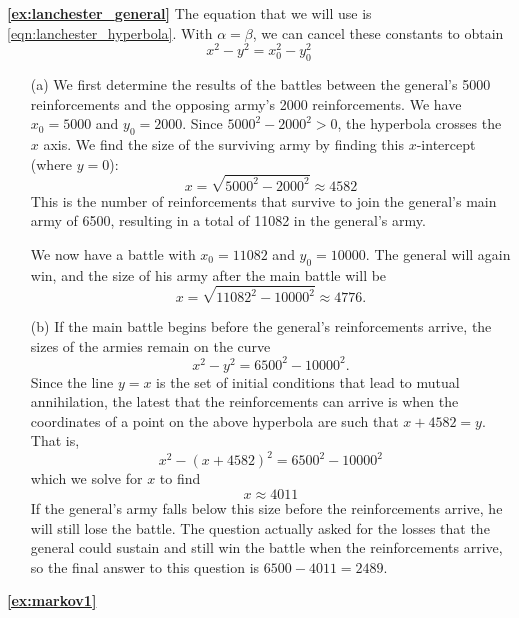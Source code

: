 \documentclass[reqno]{immbook}
\numberwithin{equation}{chapter}
\numberwithin{question}{section}
\numberwithin{theorem}{chapter}
\numberwithin{figure}{chapter}
\theoremstyle{definition}
\begin{document}
\textbf{\ref{ex:lanchester_general}}
The equation that we will use is \eqref{eqn:lanchester_hyperbola}.
With $\alpha=\beta$,
we can cancel these constants to obtain
\[
   x^2 - y^2 = x_0^2 - y_0^2
\]
\begin{enumerate}
\item[(a)]
We first determine the results of the battles between the general's
5000 reinforcements and the opposing army's 2000 reinforcements.
We have $x_0=5000$ and $y_0=2000$.
Since $5000^2 - 2000^2 > 0$, the hyperbola crosses the $x$
axis.  We find the size of the surviving army by finding this
$x$-intercept (where $y=0$):
\[
   x = \sqrt{5000^2-2000^2} \approx 4582
\]
This is the number of reinforcements that survive to join
the general's main army of 6500, resulting in a total
of 11082 in the general's army.

We now have a battle with $x_0 = 11082$ and $y_0 = 10000$.
The general
will again win, and the size of his army after the main battle
will be
\[
   x = \sqrt{11082^2 - 10000^2} \approx 4776.
\]
\item[(b)]
If the main battle begins before the general's reinforcements arrive,
the sizes of the armies remain on the curve
\[
   x^2 - y^2 = 6500^2 - 10000^2.
\]
Since the line $y=x$ is the set of initial conditions
that lead to mutual annihilation, the latest that the 
reinforcements can arrive is when the coordinates of a point
on the above hyperbola are such that $x+4582 = y$.
That is,
\[
   x^2- (x+4582)^2 = 6500^2 - 10000^2
\]
which we solve for $x$ to find
\[
   x \approx 4011
\]
If the general's army falls below this size before the
reinforcements arrive, he will still lose the battle.
The question actually asked for the losses that the
general could sustain and still win the battle
when the reinforcements arrive, so the final answer
to this question is $6500-4011 = 2489$.
\end{enumerate}
\newpage
\textbf{\ref{ex:markov1}}
\end{document}
